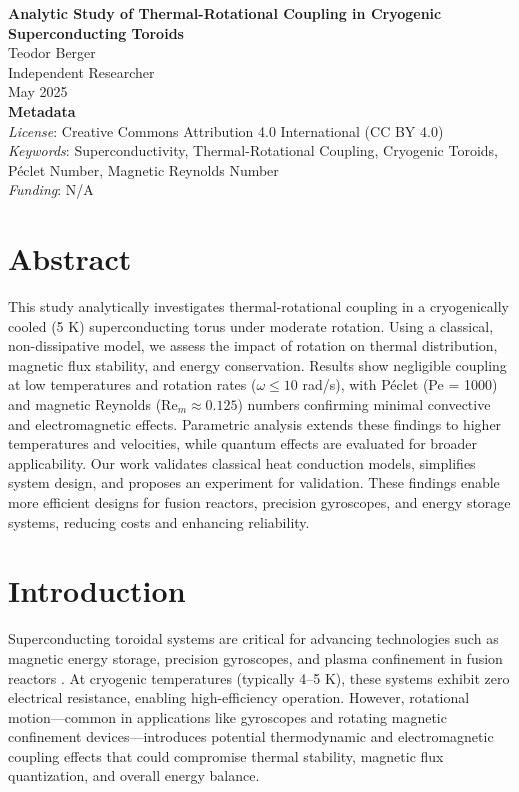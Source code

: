\documentclass[12pt]{article}
\begin{document}
\begin{titlepage}
    \centering
    \vspace*{2cm}
    \textbf{\Large Analytic Study of Thermal-Rotational Coupling in Cryogenic Superconducting Toroids} \\
    \vspace{1cm}
    \large Teodor Berger \\
    Independent Researcher \\
    May 2025 \\
    \vspace{1cm}
    \textbf{Metadata} \\
    \textit{License}: Creative Commons Attribution 4.0 International (CC BY 4.0) \\
    \textit{Keywords}: Superconductivity, Thermal-Rotational Coupling, Cryogenic Toroids, Péclet Number, Magnetic Reynolds Number \\
    \textit{Funding}: N/A \\
    \vfill
\end{titlepage}

\section*{Abstract}
This study analytically investigates thermal-rotational coupling in a cryogenically cooled (5 K) superconducting torus under moderate rotation. Using a classical, non-dissipative model, we assess the impact of rotation on thermal distribution, magnetic flux stability, and energy conservation. Results show negligible coupling at low temperatures and rotation rates ($\omega \leq 10$ rad/s), with Péclet (Pe = 1000) and magnetic Reynolds (Re$_m \approx 0.125$) numbers confirming minimal convective and electromagnetic effects. Parametric analysis extends these findings to higher temperatures and velocities, while quantum effects are evaluated for broader applicability. Our work validates classical heat conduction models, simplifies system design, and proposes an experiment for validation. These findings enable more efficient designs for fusion reactors, precision gyroscopes, and energy storage systems, reducing costs and enhancing reliability.

\section{Introduction}
Superconducting toroidal systems are critical for advancing technologies such as magnetic energy storage, precision gyroscopes, and plasma confinement in fusion reactors \citep{Tinkham2004}. At cryogenic temperatures (typically 4–5 K), these systems exhibit zero electrical resistance, enabling high-efficiency operation. However, rotational motion—common in applications like gyroscopes and rotating magnetic confinement devices—introduces potential thermodynamic and electromagnetic coupling effects that could compromise thermal stability, magnetic flux quantization, and overall energy balance.
\end{document}
